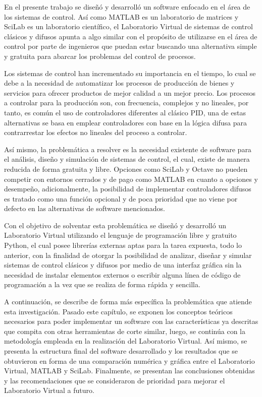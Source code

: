 
En el presente trabajo se diseñó y desarrolló un software enfocado en el área de los sistemas de control. Así como MATLAB es un laboratorio de matrices y SciLab es un laboratorio científico, el Laboratorio Virtual de sistemas de control clásicos y difusos apunta a algo similar con el propósito de utilizarse en el área de control por parte de ingenieros que puedan estar buscando una alternativa simple y gratuita para abarcar los problemas del control de procesos.

Los sistemas de control han incrementado su importancia en el tiempo, lo cual se debe a la necesidad de automatizar los procesos de producción de bienes y servicios para ofrecer productos de mejor calidad a un mejor precio. Los procesos a controlar para la producción son, con frecuencia, complejos y no lineales, por tanto, es común el uso de controladores diferentes al clásico PID, una de estas alternativas se basa en emplear controladores con base en la lógica difusa para contrarrestar los efectos no lineales del proceso a controlar.

Así mismo, la problemática a resolver es la necesidad existente de software para el análisis, diseño y simulación de sistemas de control, el cual, existe de manera reducida de forma gratuita y libre. Opciones como SciLab y Octave no pueden competir con entornos cerrados y de pago como MATLAB en cuanto a opciones y desempeño, adicionalmente, la posibilidad de implementar controladores difusos es tratado como una función opcional y de poca prioridad que no viene por defecto en las alternativas de software mencionados.

Con el objetivo de solventar esta problemática se diseñó y desarrolló un Laboratorio Virtual utilizando el lenguaje de programación libre y gratuito Python, el cual posee librerías externas aptas para la tarea expuesta, todo lo anterior, con la finalidad de otorgar la posibilidad de analizar, diseñar y simular sistemas de control clásicos y difusos por medio de una interfaz gráfica sin la necesidad de instalar elementos externos o escribir alguna línea de código de programación a la vez que se realiza de forma rápida y sencilla.

A continuación, se describe de forma más específica la problemática que atiende esta investigación. Pasado este capítulo, se exponen los conceptos teóricos necesarios para poder implementar un software con las características ya descritas que compita con otras herramientas de corte similar, luego, se continúa con la metodología empleada en la realización del Laboratorio Virtual. Así mismo, se presenta la estructura final del software desarrollado y los resultados que se obtuvieron en forma de una comparación numérica y gráfica entre el Laboratorio Virtual, MATLAB y SciLab. Finalmente, se presentan las conclusiones obtenidas y las recomendaciones que se consideraron de prioridad para mejorar el Laboratorio Virtual a futuro.
